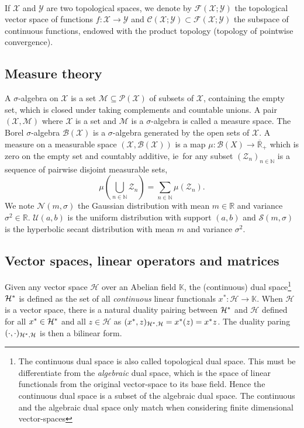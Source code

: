 \paragraph{}
If $\mathcal{X}$ and $\mathcal{Y}$ are two topological spaces, we denote by
$\mathcal{F}(\mathcal{X};\mathcal{Y})$ the topological vector space of
functions $f:\mathcal{X}\to\mathcal{Y}$ and
$\mathcal{C}(\mathcal{X};\mathcal{Y}) \subset
\mathcal{F}(\mathcal{X};\mathcal{Y})$ the subspace of continuous functions,
endowed with the product topology (topology of pointwise convergence).

\subsection{Measure theory}
A $\sigma$-algebra on $\mathcal{X}$ is a set
$\mathcal{M}\subseteq\mathcal{P}(\mathcal{X})$ of subsets of $\mathcal{X}$,
containing the empty set, which is closed under taking complements and
countable unions. A pair $(\mathcal{X},\mathcal{M})$ where $\mathcal{X}$ is a
set and $\mathcal{M}$ is a $\sigma$-algebra is called a measure space. The
Borel $\sigma$-algebra $\mathcal{B}(\mathcal{X})$ is a $\sigma$-algebra
generated by the open sets of $\mathcal{X}$. A measure on a measurable space
$(\mathcal{X},\mathcal{B}(\mathcal{X}))$ is a map $\mu: \mathcal{B}(X) \to
\overline{\mathbb{R}}_+$ which is zero on the empty set and countably additive,
\acs{ie}~for any subset $(\mathcal{Z}_n)_{n\in\mathbb{N}}$ is a sequence of
pairwise disjoint measurable sets,
\begin{dmath*}
    \mu\left(\bigcup_{n\in\mathbb{N}}\mathcal{Z}_n\right) =
    \sum_{n\in\mathbb{N}}\mu(\mathcal{Z}_n).
\end{dmath*}
We note $\mathcal{N}(m, \sigma)$ the Gaussian distribution with
mean $m\in\mathbb{R}$ and variance $\sigma^2\in\mathbb{R}$. $\mathcal{U}(a, b)$
is the uniform distribution with support $(a, b)$ and $\mathcal{S}(m, \sigma)$
is the hyperbolic secant distribution with mean $m$ and variance $\sigma^2$.

\subsection{Vector spaces, linear operators and matrices}
Given any vector space $\mathcal{H}$ over an Abelian field $\mathbb{K}$, the
(continuous) dual space\footnote{The continuous dual space is also called
topological dual space. This must be differentiate from the \emph{algebraic}
dual space, which is the space of linear functionals from the original
vector-space to its base field. Hence the continuous dual space is a subset of
the algebraic dual space. The continuous and the algebraic dual space only
match when considering finite dimensional vector-spaces} $\mathcal{H}^*$
is defined as the set of all \emph{continuous} linear functionals $x^*:
\mathcal{H} \to \mathbb{K}$. When $\mathcal{H}$ is a vector space, there is a
natural duality pairing between $\mathcal{H}^*$ and $\mathcal{H}$
defined for all $x^*\in\mathcal{H}^*$ and all $z\in\mathcal{H}$
as $(x^*, z)_{\mathcal{H}^*, \mathcal{H}} = x^*(z)
= x^* z$. The duality paring $(\cdot,
\cdot)_{\mathcal{H}^*,\mathcal{H}}$ is then a bilinear form.
